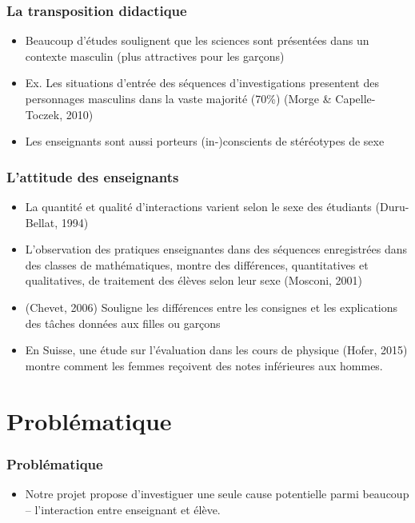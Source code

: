 \documentclass{beamer}
\begin{document}
\begin{frame}
\frametitle{La transposition didactique}
\begin{itemize}
\item Beaucoup d’études soulignent que les sciences sont présentées
  dans un contexte masculin (plus attractives pour les garçons)
\item Ex. Les situations d’entrée des séquences d’investigations presentent
  des personnages masculins dans la vaste majorité (70\%)
  (Morge \& Capelle-Toczek, 2010)
\item Les enseignants sont aussi porteurs (in-)conscients
  de stéréotypes de sexe
\end{itemize}
\end{frame}

\begin{frame}
\frametitle{L'attitude des enseignants}
\begin{itemize}
\item La quantité et qualité d’interactions varient  selon le sexe des
  étudiants (Duru-Bellat, 1994)
\item L'observation des pratiques enseignantes dans des séquences
  enregistrées dans des classes de mathématiques, montre des différences,
  quantitatives et qualitatives, de traitement des élèves selon leur sexe
  (Mosconi, 2001)
\item (Chevet, 2006) Souligne les différences entre les consignes et les
  explications des tâches données aux filles ou garçons
\item En Suisse, une étude sur l’évaluation dans les cours de physique
  (Hofer, 2015) montre comment les femmes reçoivent des notes inférieures
  aux hommes.
\end{itemize}
\end{frame}

\section{Problématique}
\begin{frame}
\frametitle{Problématique}
\begin{itemize}
\item Notre projet propose d'investiguer une seule cause potentielle parmi beaucoup -- l'interaction entre enseignant et élève.
\end{itemize}
\end{frame}
\end{document}

